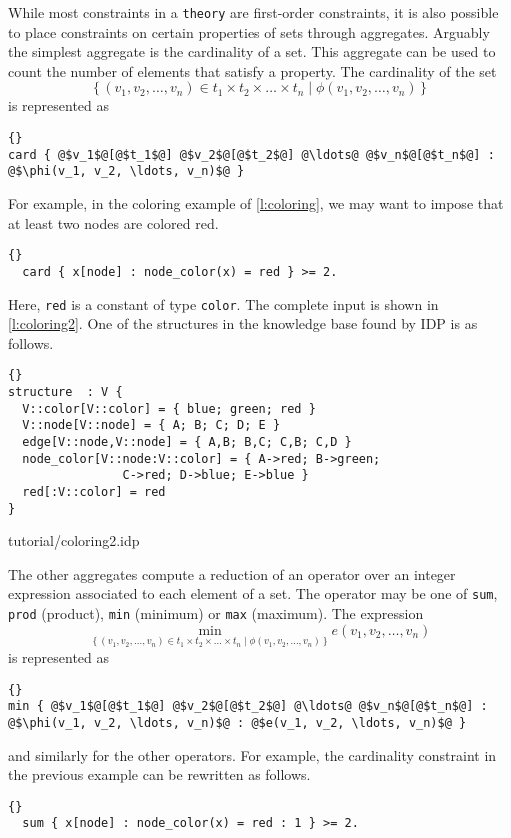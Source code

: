 \documentclass{article}
\newcommand{\idp}{{\sc IDP}\xspace}
\begin{document}
While most constraints in a \texttt{theory} are first-order constraints,
it is also possible to place constraints on certain properties of sets
through aggregates.
Arguably the simplest aggregate is the cardinality of a set.
This aggregate can be used to count the number of elements that
satisfy a property.
The cardinality of the set
$$
\{\,
(v_1, v_2, \ldots, v_n) \in t_1 \times t_2 \times \ldots \times t_n \mid
\phi(v_1, v_2, \ldots, v_n)
\,\}
$$
is represented as
\begin{lstlisting}[escapechar=@]{}
card { @$v_1$@[@$t_1$@] @$v_2$@[@$t_2$@] @\ldots@ @$v_n$@[@$t_n$@] : @$\phi(v_1, v_2, \ldots, v_n)$@ }
\end{lstlisting}
For example, in the coloring example of \autoref{l:coloring},
we may want to impose that at least two nodes are colored red.
\begin{lstlisting}{}
  card { x[node] : node_color(x) = red } >= 2.
\end{lstlisting}
Here, \texttt{red} is a constant of type \texttt{color}.
The complete input is shown in \autoref{l:coloring2}.
One of the structures in the knowledge base found by \idp is as follows.
\begin{lstlisting}{}
structure  : V {
  V::color[V::color] = { blue; green; red }
  V::node[V::node] = { A; B; C; D; E }
  edge[V::node,V::node] = { A,B; B,C; C,B; C,D }
  node_color[V::node:V::color] = { A->red; B->green;
			    C->red; D->blue; E->blue }
  red[:V::color] = red
}
\end{lstlisting}


	{tutorial/coloring2.idp}

The other aggregates compute a reduction of an operator over
an integer expression associated to each element of a set.
The operator may be one of \texttt{sum},
\texttt{prod} (product), \texttt{min} (minimum) or \texttt{max} (maximum).
The expression
$$
\min_{
\{\,
(v_1, v_2, \ldots, v_n) \in t_1 \times t_2 \times \ldots \times t_n \mid
\phi(v_1, v_2, \ldots, v_n)
\,\}} e(v_1, v_2, \ldots, v_n)
$$
is represented as
\begin{lstlisting}[escapechar=@]{}
min { @$v_1$@[@$t_1$@] @$v_2$@[@$t_2$@] @\ldots@ @$v_n$@[@$t_n$@] : @$\phi(v_1, v_2, \ldots, v_n)$@ : @$e(v_1, v_2, \ldots, v_n)$@ }
\end{lstlisting}
and similarly for the other operators.
For example, the cardinality constraint in the previous example
can be rewritten as follows.
\begin{lstlisting}{}
  sum { x[node] : node_color(x) = red : 1 } >= 2.
\end{lstlisting}
\end{document}
